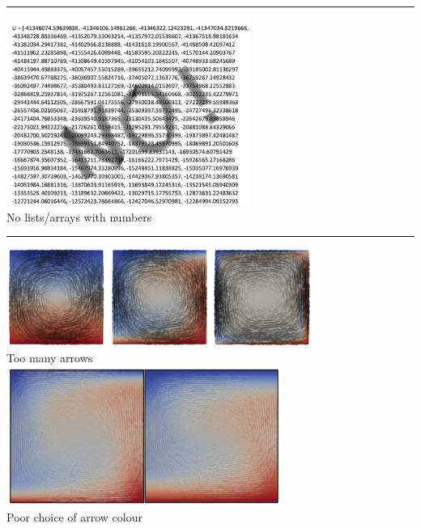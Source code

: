 \par\noindent\rule{\textwidth}{0.4pt}
\begin{center}
\includegraphics[width=8cm]{images/grading/numbers}\\
No lists/arrays with numbers
\end{center}

\par\noindent\rule{\textwidth}{0.4pt}
\begin{center}
\includegraphics[width=10cm]{images/grading/arrows2}\\
Too many arrows\\
\includegraphics[width=9cm]{images/grading/arrows1}\\
Poor choice of arrow colour
\end{center}

